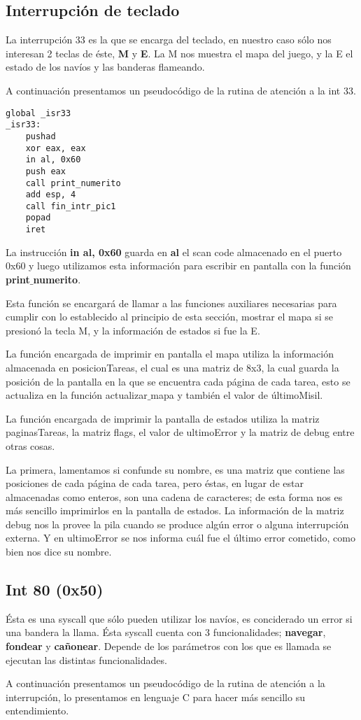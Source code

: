 \subsection{Interrupción de teclado}
\par{La interrupción 33 es la que se encarga del teclado, en nuestro caso sólo nos interesan 2 teclas de éste, \textbf{M} y \textbf{E}. La M nos muestra el mapa del juego, y la E el estado de los navíos y las banderas flameando.}
\par{A continuación presentamos un pseudocódigo de la rutina de atención a la int 33.}
\begin{lstlisting}[language={[x86masm]Assembler}]
global _isr33
_isr33:
    pushad
    xor eax, eax
    in al, 0x60
    push eax
    call print_numerito
    add esp, 4
    call fin_intr_pic1
    popad
    iret
\end{lstlisting}
\par{La instrucción \textbf{in al, 0x60} guarda en \textbf{al} el scan code almacenado en el puerto 0x60 y luego utilizamos esta información para escribir en pantalla con la función \textbf{print$\_$numerito}.}
\par{Esta función se encargará de llamar a las funciones auxiliares necesarias para cumplir con lo establecido al principio de esta sección, mostrar el mapa si se presionó la tecla M, y la información de estados si fue la E.}
\par{La función encargada de imprimir en pantalla el mapa utiliza la información almacenada en posicionTareas, el cual es una matriz de 8x3, la cual guarda la posición de la pantalla en la que se encuentra cada página de cada tarea, esto se actualiza en la función actualizar$\_$mapa y también el valor de últimoMisil.}
\par{ La función encargada de imprimir la pantalla de estados utiliza la matriz paginasTareas, la matriz flags, el valor de ultimoError y la matriz de debug entre otras cosas.}
\par{ La primera, lamentamos si confunde su nombre, es una matriz que contiene las posiciones de cada página de cada tarea, pero éstas, en lugar de estar almacenadas como enteros, son una cadena de caracteres; de esta forma nos es más sencillo imprimirlos en la pantalla de estados. La información de la matriz debug nos la provee la pila cuando se produce algún error o alguna interrupción externa. Y en ultimoError se nos informa cuál fue el último error cometido, como bien nos dice su nombre.}
\subsection{Int 80 (0x50)}
\par{Ésta es una syscall que sólo pueden utilizar los navíos, es conciderado un error si una bandera la llama. Ésta syscall cuenta con 3 funcionalidades; \textbf{navegar}, \textbf{fondear} y \textbf{cañonear}. Depende de los parámetros con los que es llamada se ejecutan las distintas funcionalidades.}
\par{A continuación presentamos un pseudocódigo de la rutina de atención a la interrupción, lo presentamos en lenguaje C para hacer más sencillo su entendimiento.}

